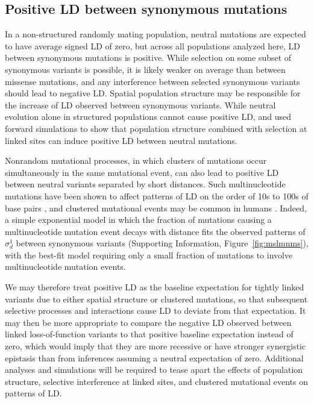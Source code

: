 \documentclass[]{article}
\begin{document}
\subsection{Positive LD between synonymous mutations}

In a non-structured randomly mating population, neutral mutations are expected
to have average signed LD of zero, but across all populations analyzed here, LD
between synonymous mutations is positive. While selection on some subset of
synonymous variants is possible, it is likely weaker on average than
between missense mutations, and any interference between selected synonymous
variants should lead to negative LD.  Spatial population structure may be
responsible for the increase of LD observed between synonymous variants. While
neutral evolution alone in structured populations cannot cause positive LD,
\citet{Sohail2017-zq} and \citet{Sandler2021-of} used forward simulations to
show that population structure combined with selection at linked sites can
induce positive LD between neutral mutations.

Nonrandom mutational processes, in which clusters of mutations occur
simultaneously in the same mutational event, can also lead to positive LD
between neutral variants separated by short distances. Such multinucleotide
mutations have been shown to affect patterns of LD on the order of 10s to 100s
of base pairs \citep{Harris2014-zg}, and clustered mutational events may be
common in humans \citep{Besenbacher2016-ac}. Indeed, a simple exponential model
in which the fraction of mutations causing a multinucleotide mutation event
decays with distance fits the observed patterns of \(\sigma_d^1\) between
synonymous variants (Supporting Information, Figure~\ref{fig:mslmnms}), with
the best-fit model requiring only a small fraction of mutations to involve
multinucleotide mutation events.

We may therefore treat positive LD as the baseline expectation for tightly
linked variants due to either spatial structure or clustered mutations, so that
subsequent selective processes and interactions cause LD to deviate from that
expectation. It may then be more appropriate to compare the negative LD
observed between linked loss-of-function variants to that positive baseline
expectation instead of zero, which would imply that they are more recessive or
have stronger synergistic epistasis than from inferences assuming a neutral
expectation of zero. Additional analyses and simulations will be
required to tease apart the effects of population structure, selective
interference at linked sites, and clustered mutational events on patterns of
LD.
\end{document}
